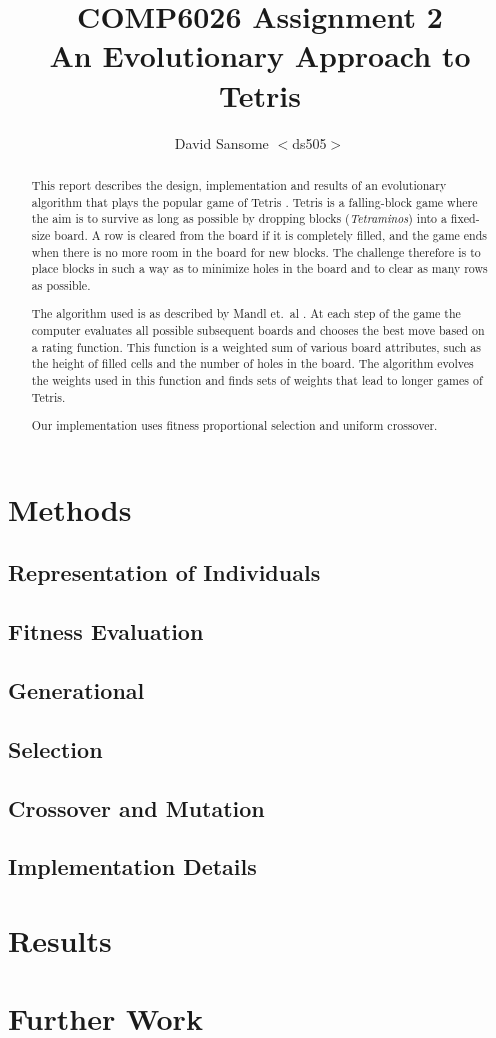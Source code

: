 \documentclass[a4paper,12pt]{article}
\title{COMP6026 Assignment 2 \\
An Evolutionary Approach to Tetris}
\author{David Sansome $<$ds505$>$}
\begin{document}


\maketitle

\begin{abstract}

This report describes the design, implementation and results of an evolutionary
algorithm that plays the popular game of Tetris \cite{AboutTetris}.
Tetris is a falling-block game where the aim is to survive as long as possible
by dropping blocks (\emph{Tetraminos}) into a fixed-size board.
A row is cleared from the board if it is completely filled, and the game ends
when there is no more room in the board for new blocks.
The challenge therefore is to place blocks in such a way as to minimize holes
in the board and to clear as many rows as possible.

The algorithm used is as described by Mandl et.\ al \cite{Mandl2005}.
At each step of the game the computer evaluates all possible subsequent boards
and chooses the best move based on a rating function.
This function is a weighted sum of various board attributes, such as the height
of filled cells and the number of holes in the board.
The algorithm evolves the weights used in this function and finds sets of
weights that lead to longer games of Tetris.

Our implementation uses fitness proportional selection and uniform crossover.

\end{abstract}

\tableofcontents

\section{Methods}

\subsection{Representation of Individuals}
\subsection{Fitness Evaluation}
\subsection{Generational}
\subsection{Selection}
\subsection{Crossover and Mutation}
\subsection{Implementation Details}

\section{Results}

\section{Further Work}


\end{document}
